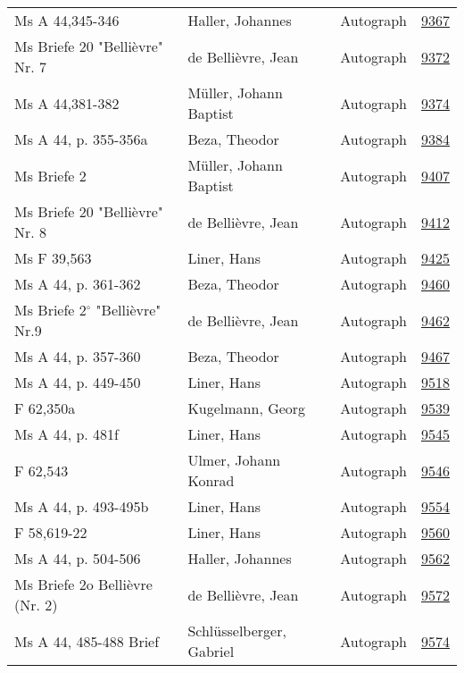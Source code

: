 \documentclass[10pt,a4paper,landscape]{report}
\begin{document}
\begin{longtable}{p{16cm}p{4cm}lr}
Ms A 44,345-346	&	Haller, Johannes	&	Autograph	&	\href{http://130.60.24.72/assignment/9367}{9367}\\
Ms Briefe 20 "Bellièvre" Nr. 7	&	de Bellièvre, Jean	&	Autograph	&	\href{http://130.60.24.72/assignment/9372}{9372}\\
Ms A 44,381-382	&	Müller, Johann Baptist	&	Autograph	&	\href{http://130.60.24.72/assignment/9374}{9374}\\
Ms A 44, p. 355-356a	&	Beza, Theodor	&	Autograph	&	\href{http://130.60.24.72/assignment/9384}{9384}\\
Ms Briefe 2	&	Müller, Johann Baptist	&	Autograph	&	\href{http://130.60.24.72/assignment/9407}{9407}\\
Ms Briefe 20  "Bellièvre" Nr. 8	&	de Bellièvre, Jean	&	Autograph	&	\href{http://130.60.24.72/assignment/9412}{9412}\\
Ms F 39,563	&	Liner, Hans	&	Autograph	&	\href{http://130.60.24.72/assignment/9425}{9425}\\
Ms A 44, p. 361-362	&	Beza, Theodor	&	Autograph	&	\href{http://130.60.24.72/assignment/9460}{9460}\\
Ms Briefe 2$^\circ$ "Bellièvre" Nr.9	&	de Bellièvre, Jean	&	Autograph	&	\href{http://130.60.24.72/assignment/9462}{9462}\\
Ms A 44, p. 357-360	&	Beza, Theodor	&	Autograph	&	\href{http://130.60.24.72/assignment/9467}{9467}\\
Ms A 44, p. 449-450	&	Liner, Hans	&	Autograph	&	\href{http://130.60.24.72/assignment/9518}{9518}\\
F 62,350a	&	Kugelmann, Georg	&	Autograph	&	\href{http://130.60.24.72/assignment/9539}{9539}\\
Ms A 44, p. 481f	&	Liner, Hans	&	Autograph	&	\href{http://130.60.24.72/assignment/9545}{9545}\\
F 62,543	&	Ulmer, Johann Konrad	&	Autograph	&	\href{http://130.60.24.72/assignment/9546}{9546}\\
Ms A 44, p. 493-495b	&	Liner, Hans	&	Autograph	&	\href{http://130.60.24.72/assignment/9554}{9554}\\
F 58,619-22	&	Liner, Hans	&	Autograph	&	\href{http://130.60.24.72/assignment/9560}{9560}\\
Ms A 44, p. 504-506	&	Haller, Johannes	&	Autograph	&	\href{http://130.60.24.72/assignment/9562}{9562}\\
Ms Briefe 2o Bellièvre (Nr. 2)	&	de Bellièvre, Jean	&	Autograph	&	\href{http://130.60.24.72/assignment/9572}{9572}\\
Ms A 44, 485-488 Brief	&	Schlüsselberger, Gabriel	&	Autograph	&	\href{http://130.60.24.72/assignment/9574}{9574}\\

\end{longtable}
\end{document}
